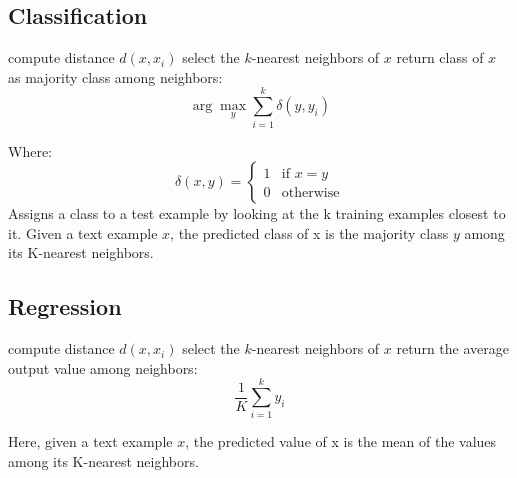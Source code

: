 \subsection{Classification}
\begin{algorithm}
\caption{$k$-Nearest Neighbor Classification}
\begin{algorithmic}[1]
        \State compute distance $d(x, x_i)$
    \EndFor
    \State select the $k$-nearest neighbors of $x$
    \State return class of $x$ as majority class among neighbors:
    \[
        \arg\max_y \sum_{i=1}^{k} \delta(y, y_i)
    \]
\EndFor
\end{algorithmic}
\end{algorithm}

Where:
\[
\delta(x,y) = 
\begin{cases}
    1 & \text{if } x = y \\
    0 & \text{otherwise}
\end{cases}
\]
Assigns a class to a test example by looking at the k training examples closest to it. Given a text example $x$, 
the predicted class of x is the majority class $y$ among its K-nearest neighbors.

\subsection{Regression}
\begin{algorithm}
\caption{$k$-Nearest Neighbor Regression}
\begin{algorithmic}[1]
        \State compute distance $d(x, x_i)$
    \EndFor
    \State select the $k$-nearest neighbors of $x$
    \State return the average output value among neighbors:
    \[
        \frac{1}{K} \sum_{i=1}^ky_i
    \]
\EndFor
\end{algorithmic}
\end{algorithm}
Here, given a text example $x$, the predicted value of x is the mean of the values among its K-nearest neighbors.

